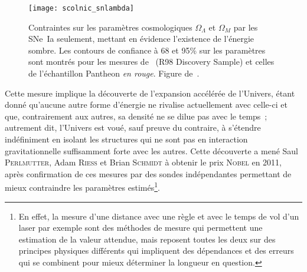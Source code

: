 \documentclass[../main/main.tex]{subfiles}
\begin{document}
\begin{SCfigure}[1][ht]
    \centering
    \texttt{[image: scolnic\_snlambda]}
    \caption[Contraintes sur les paramètres cosmologiques $\Omega_\Lambda$ et
    $\Omega_M$ par les SNe~Ia seulement]{Contraintes sur les paramètres
        cosmologiques $\Omega_\Lambda$ et $\Omega_M$ par les SNe~Ia seulement,
        mettant en évidence l'existence de l'énergie sombre. Les contours de
        confiance à 68 et 95\% sur les paramètres sont montrés pour les mesures
        de~\cite{riess1998} (R98 Discovery Sample) et celles de l'échantillon
        Pantheon \textit{en rouge}. Figure
    de~\cite{scolnic2018}.}\label{fig:snlambda}
\end{SCfigure}

Cette mesure implique la découverte de l'expansion accélérée de l'Univers, étant
donné qu'aucune autre forme d'énergie ne rivalise actuellement avec celle-ci et
que, contrairement aux autres, sa densité ne se dilue pas avec le temps~;
autrement dit, l'Univers est voué, sauf preuve du contraire, à s'étendre
indéfiniment en isolant les structures qui ne sont pas en interaction
gravitationnelle suffisamment forte avec les autres. Cette découverte a mené
Saul \textsc{Perlmutter}, Adam \textsc{Riess} et Brian \textsc{Schmidt} à
obtenir le prix \textsc{Nobel} en 2011, après confirmation de ces mesures par
des sondes indépendantes permettant de mieux contraindre les paramètres
estimés\footnote{En effet, la mesure d'une distance avec une règle et avec le
    temps de vol d'un laser par exemple sont des méthodes de mesure qui
    permettent une estimation de la valeur attendue, mais reposent toutes les
    deux sur des principes physiques différents qui impliquent des dépendances
    et des erreurs qui se combinent pour mieux déterminer la longueur en
question.}.
\end{document}
